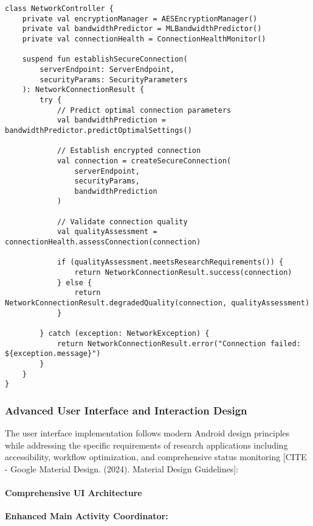 \documentclass[12pt,a4paper]{article}
\begin{document}
\begin{verbatim}
class NetworkController {
    private val encryptionManager = AESEncryptionManager()
    private val bandwidthPredictor = MLBandwidthPredictor()
    private val connectionHealth = ConnectionHealthMonitor()

    suspend fun establishSecureConnection(
        serverEndpoint: ServerEndpoint,
        securityParams: SecurityParameters
    ): NetworkConnectionResult {
        try {
            // Predict optimal connection parameters
            val bandwidthPrediction = bandwidthPredictor.predictOptimalSettings()

            // Establish encrypted connection
            val connection = createSecureConnection(
                serverEndpoint,
                securityParams,
                bandwidthPrediction
            )

            // Validate connection quality
            val qualityAssessment = connectionHealth.assessConnection(connection)

            if (qualityAssessment.meetsResearchRequirements()) {
                return NetworkConnectionResult.success(connection)
            } else {
                return NetworkConnectionResult.degradedQuality(connection, qualityAssessment)
            }

        } catch (exception: NetworkException) {
            return NetworkConnectionResult.error("Connection failed: ${exception.message}")
        }
    }
}
\end{verbatim}

\subsubsection{Advanced User Interface and Interaction Design}

The user interface implementation follows modern Android design principles while addressing the specific requirements of
research applications including accessibility, workflow optimization, and comprehensive status
monitoring [CITE - Google Material Design. (2024). Material Design Guidelines]:

\paragraph{Comprehensive UI Architecture}

\textbf{Enhanced Main Activity Coordinator:}
\end{document}
